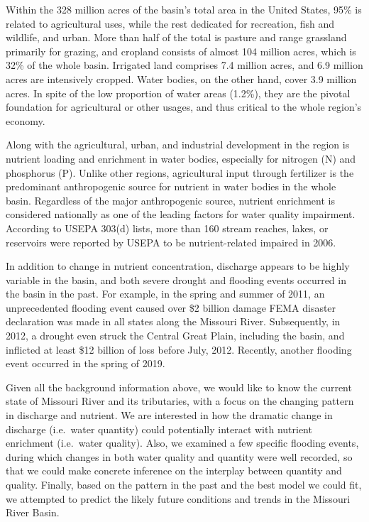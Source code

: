 \documentclass[12pt,]{article}
\begin{document}
Within the 328 million acres of the basin's total area in the United
States, 95\% is related to agricultural uses, while the rest dedicated
for recreation, fish and wildlife, and urban. More than half of the
total is pasture and range grassland primarily for grazing, and cropland
consists of almost 104 million acres, which is 32\% of the whole basin.
Irrigated land comprises 7.4 million acres, and 6.9 million acres are
intensively cropped. Water bodies, on the other hand, cover 3.9 million
acres. In spite of the low proportion of water areas (1.2\%), they are
the pivotal foundation for agricultural or other usages, and thus
critical to the whole region's economy.

Along with the agricultural, urban, and industrial development in the
region is nutrient loading and enrichment in water bodies, especially
for nitrogen (N) and phosphorus (P). Unlike other regions, agricultural
input through fertilizer is the predominant anthropogenic source for
nutrient in water bodies in the whole basin. Regardless of the major
anthropogenic source, nutrient enrichment is considered nationally as
one of the leading factors for water quality impairment. According to
USEPA 303(d) lists, more than 160 stream reaches, lakes, or reservoirs
were reported by USEPA to be nutrient-related impaired in 2006.

In addition to change in nutrient concentration, discharge appears to be
highly variable in the basin, and both severe drought and flooding
events occurred in the basin in the past. For example, in the spring and
summer of 2011, an unprecedented flooding event caused over \$2 billion
damage FEMA disaster declaration was made in all states along the
Missouri River. Subsequently, in 2012, a drought even struck the Central
Great Plain, including the basin, and inflicted at least \$12 billion of
loss before July, 2012. Recently, another flooding event occurred in the
spring of 2019.

Given all the background information above, we would like to know the
current state of Missouri River and its tributaries, with a focus on the
changing pattern in discharge and nutrient. We are interested in how the
dramatic change in discharge (i.e.~water quantity) could potentially
interact with nutrient enrichment (i.e.~water quality). Also, we
examined a few specific flooding events, during which changes in both
water quality and quantity were well recorded, so that we could make
concrete inference on the interplay between quantity and quality.
Finally, based on the pattern in the past and the best model we could
fit, we attempted to predict the likely future conditions and trends in
the Missouri River Basin.
\end{document}
